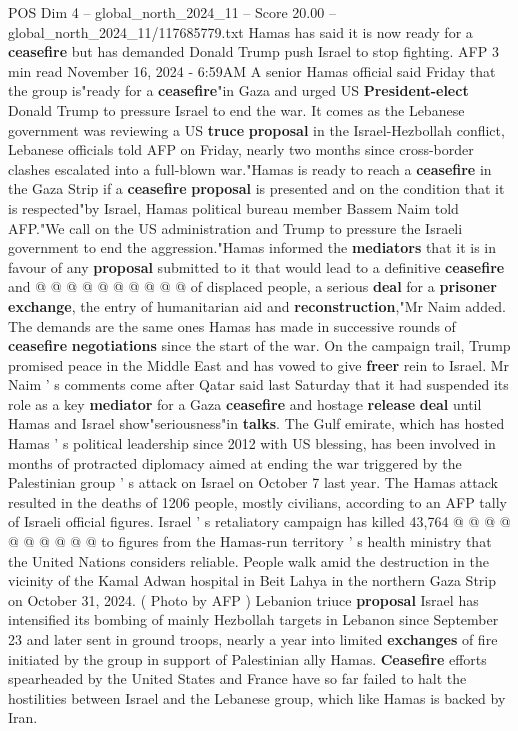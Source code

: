 \begin{textsample}{POS Dim 4 – global\_north\_2024\_11 – Score 20.00 – global\_north\_2024\_11/117685779.txt}  \label{ex:f4_pos_285}
Hamas has said it is now ready for a \textbf{ceasefire} but has demanded Donald Trump push Israel to stop fighting.
AFP 3 min read November 16, 2024 - 6:59AM A senior Hamas official said Friday that the group is"ready for a \textbf{ceasefire}"in Gaza and urged US \textbf{President-elect} Donald Trump to pressure Israel to end the war.
It comes as the Lebanese government was reviewing a US \textbf{truce} \textbf{proposal} in the Israel-Hezbollah conflict, Lebanese officials told AFP on Friday, nearly two months since cross-border clashes escalated into a full-blown war."Hamas is ready to reach a \textbf{ceasefire} in the Gaza Strip if a \textbf{ceasefire} \textbf{proposal} is presented and on the condition that it is respected"by Israel, Hamas political bureau member Bassem Naim told AFP."We call on the US administration and Trump to pressure the Israeli government to end the aggression."Hamas informed the \textbf{mediators} that it is in favour of any \textbf{proposal} submitted to it that would lead to a definitive \textbf{ceasefire} and @ @ @ @ @ @ @ @ @ @ of displaced people, a serious \textbf{deal} for a \textbf{prisoner} \textbf{exchange}, the entry of humanitarian aid and \textbf{reconstruction},"Mr Naim added.
The demands are the same ones Hamas has made in successive rounds of \textbf{ceasefire} \textbf{negotiations} since the start of the war.
On the campaign trail, Trump promised peace in the Middle East and has vowed to give \textbf{freer} rein to Israel.
Mr Naim ' s comments come after Qatar said last Saturday that it had suspended its role as a key \textbf{mediator} for a Gaza \textbf{ceasefire} and hostage \textbf{release} \textbf{deal} until Hamas and Israel show"seriousness"in \textbf{talks}.
The Gulf emirate, which has hosted Hamas ' s political leadership since 2012 with US blessing, has been involved in months of protracted diplomacy aimed at ending the war triggered by the Palestinian group ' s attack on Israel on October 7 last year.
The Hamas attack resulted in the deaths of 1206 people, mostly civilians, according to an AFP tally of Israeli official figures.
Israel ' s retaliatory campaign has killed 43,764 @ @ @ @ @ @ @ @ @ @ to figures from the Hamas-run territory ' s health ministry that the United Nations considers reliable.
People walk amid the destruction in the vicinity of the Kamal Adwan hospital in Beit Lahya in the northern Gaza Strip on October 31, 2024. ( Photo by AFP ) Lebanion triuce \textbf{proposal} Israel has intensified its bombing of mainly Hezbollah targets in Lebanon since September 23 and later sent in ground troops, nearly a year into limited \textbf{exchanges} of fire initiated by the group in support of Palestinian ally Hamas. \textbf{Ceasefire} efforts spearheaded by the United States and France have so far failed to halt the hostilities between Israel and the Lebanese group, which like Hamas is backed by Iran.

\end{textsample}
